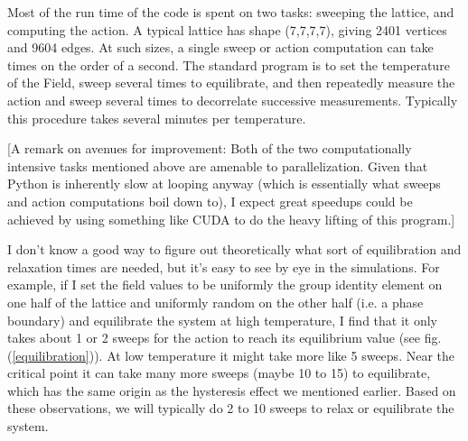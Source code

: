 \documentclass[9pt,twocolumn,twoside]{article}
\begin{document}
Most of the run time of the code is spent on two tasks: sweeping the lattice, and computing the action.  A typical lattice has shape (7,7,7,7), giving 2401 vertices and 9604 edges.  At such sizes, a single sweep or action computation can take times on the order of a second.  The standard program is to set the temperature of the Field, sweep several times to equilibrate, and then repeatedly measure the action and sweep several times to decorrelate successive measurements.  Typically this procedure takes several minutes per temperature.

[A remark on avenues for improvement: Both of the two computationally intensive tasks mentioned above are amenable to parallelization.  Given that Python is inherently slow at looping anyway (which is essentially what sweeps and action computations boil down to), I expect great speedups could be achieved by using something like CUDA to do the heavy lifting of this program.]

I don't know a good way to figure out theoretically what sort of equilibration and relaxation times are needed, but it's easy to see by eye in the simulations.  For example, if I set the field values to be uniformly the group identity element on one half of the lattice and uniformly random on the other half (i.e. a phase boundary) and equilibrate the system at high temperature, I find that it only takes about 1 or 2 sweeps for the action to reach its equilibrium value (see fig. (\ref{equilibration})).  At low temperature it might take more like 5 sweeps.  Near the critical point it can take many more sweeps (maybe 10 to 15) to equilibrate, which has the same origin as the hysteresis effect we mentioned earlier.  Based on these observations, we will typically do 2 to 10 sweeps to relax or equilibrate the system.  
\end{document}
